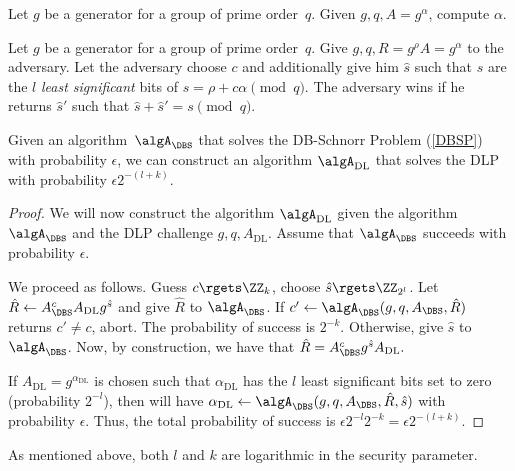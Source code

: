 \begin{definition}
  Let \(g\) be a generator for a group of prime order~\(q\).
  Given \(g, q, A = g^\alpha\), compute \(\alpha\).
\end{definition}

\begin{definition}%
  \label{DBSP}
  Let \(g\) be a generator for a group of prime order~\(q\).
  Give \(g, q, R = g^\rho A = g^\alpha\) to the adversary.
  Let the adversary choose \(c\) and additionally give him \(\hat s\) such that 
  \(\hat s\) are the \(l\) \emph{least significant} bits of \(s = \rho + 
  c\alpha \pmod q\).
  The adversary wins if he returns \(\hat s'\) such that \(\hat s + \hat s' = s 
  \pmod q\).
\end{definition}

\begin{lemma}\label{DBSPtoDLP}
  Given an algorithm~\(\algA_{\DBS}\) that solves the DB-Schnorr Problem 
  (\cref{DBSP}) with probability \(\epsilon\), we can construct an 
  algorithm \(\algA_{\text{DL}}\) that solves the \ac{DLP} with probability 
  \(\epsilon 2^{-(l+k)}\).
\end{lemma}

\begin{proof}
  We will now construct the algorithm \(\algA_{\text{DL}}\) given the algorithm 
  \(\algA_{\DBS}\) and the \ac{DLP} challenge \(g, q, A_{\text{DL}}\).
  Assume that \(\algA_{\DBS}\) succeeds with probability \(\epsilon\).

  We proceed as follows.
  Guess \(c\rgets \ZZ_k\), choose \(\hat s\rgets \ZZ_{2^l}\).
  Let \(\hat R\gets A_{\DBS}^c A_{\text{DL}} g^{\hat s}\) and give
  \(\hat R\) to \(\algA_{\DBS}\).
  If \(c'\gets \algA_{\DBS}(g, q, A_{\DBS}, \hat R)\) returns \(c'\neq c\), 
  abort.
  The probability of success is \(2^{-k}\).
  Otherwise, give \(\hat s\) to \(\algA_{\DBS}\).
  Now, by construction, we have that \(
    \hat R = A_{\DBS}^c g^{\hat s} A_{\text{DL}}.
  \)

  If \(A_{\text{DL}} = g^{\alpha_{\text{DL}}}\) is chosen such that 
  \(\alpha_{\text{DL}}\) has the \(l\) least significant bits set to zero 
  (probability \(2^{-l}\)), then will have \(
    \alpha_{\text{DL}}\gets \algA_{\DBS}(g, q, A_{\DBS}, \hat R, \hat s)
  \) with probability \(\epsilon\).
  Thus, the total probability of success is \(
    \epsilon 2^{-l} 2^{-k} = \epsilon 2^{-(l+k)}.
  \)
\end{proof}

As mentioned above, both \(l\) and \(k\) are logarithmic in the security 
parameter.

